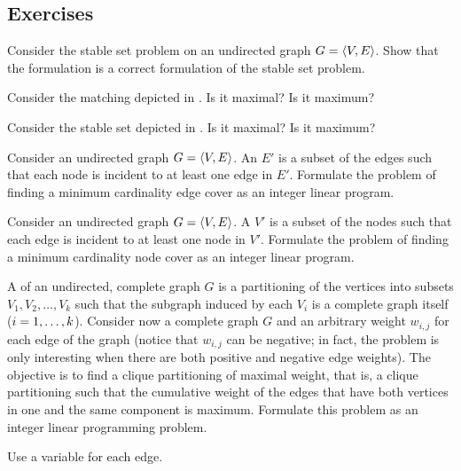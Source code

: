 \begin{definition}
\section*{Exercises}
\begin{exercise}
Consider the stable set problem on an undirected graph $G=\tupl{V,E}$. Show that the formulation  is a correct formulation of the stable set problem.
\end{exercise}
\begin{exercise}
Consider the matching depicted in . Is it maximal? Is it maximum?
\end{exercise}
\begin{exercise}
Consider the stable set depicted in . Is it maximal? Is it maximum?
\end{exercise}
\begin{exercise}
Consider an undirected graph $G=\tupl{V,E}$. An  $E'$ is a subset of the edges such that each node is incident to at least one edge in $E'$. Formulate the problem of finding a minimum cardinality edge cover as an integer linear program.
\end{exercise}
\begin{exercise}
Consider an undirected graph $G=\tupl{V,E}$. A  $V'$ is a subset of the nodes such that each edge is incident to at least one node in $V'$. Formulate the problem of finding a minimum cardinality node cover as an integer linear program.
\end{exercise}
\begin{exercise}
A  of an undirected, complete graph $G$ is a partitioning of the vertices into subsets $V_1,V_2,\ldots,V_k$ such that the subgraph induced by each $V_i$ is a complete graph itself ($\rangei[i]{1}{k}$). Consider now a complete graph $G$ and an arbitrary weight $w_{i,j}$ for each edge of the graph (notice that $w_{i,j}$ can be negative; in fact, the problem is only interesting when there are both positive and negative edge weights). The objective is to find a clique partitioning of maximal weight, that is, a clique partitioning such that the cumulative weight of the edges that have both vertices in one and the same component is maximum. Formulate this problem as an integer linear programming problem.
\begin{hint}
Use a variable for each edge.
\end{hint}
\end{exercise}

\end{definition}
